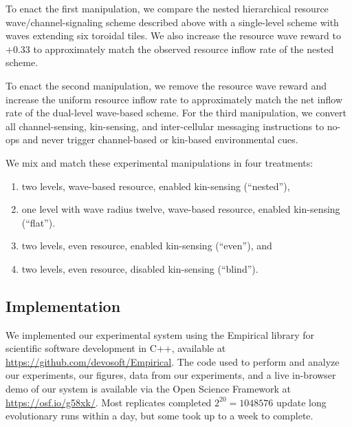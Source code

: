 To enact the first manipulation, we compare the nested hierarchical resource wave/channel-signaling scheme described above with a single-level scheme with waves extending six toroidal tiles.
We also increase the resource wave reward to $+0.33$ to approximately match the observed resource inflow rate of the nested scheme.

To enact the second manipulation, we remove the resource wave reward and increase the uniform resource inflow rate to approximately match the net inflow rate of the dual-level wave-based scheme.
For the third manipulation, we convert all channel-sensing, kin-sensing, and inter-cellular messaging instructions to no-ops and never trigger channel-based or kin-based environmental cues.

We mix and match these experimental manipulations in four treatments:
\begin{enumerate}
\item two levels, wave-based resource, enabled kin-sensing (``nested''),
\item one level with wave radius twelve, wave-based resource, enabled kin-sensing (``flat'').
\item two levels, even resource, enabled kin-sensing (``even''), and
\item two levels, even resource, disabled kin-sensing (``blind'').
\end{enumerate}

\subsection{Implementation}

We implemented our experimental system using the Empirical library for scientific software development in C++, available at \url{https://github.com/devosoft/Empirical}.
The code used to perform and analyze our experiments, our figures, data from our experiments, and a live in-browser demo of our system is available via the Open Science Framework at \url{https://osf.io/g58xk/}.
Most replicates completed $2^{20} = 1048576$ update long evolutionary runs within a day, but some took up to a week to complete.
